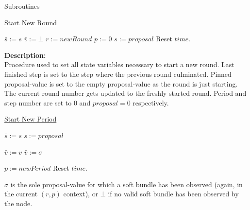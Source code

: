 \documentclass[10pt,a4paper]{article}
\begin{document}
\begin{section}{Subroutines}

\begin{algorithm}[H]\label{algo:start-new-round}
    \caption{\underline{Start New Round}}
    \label{algo:start-new-round}
    \begin{algorithmic}[1]
    \State $\bar{s} := s$
    \State $\bar{v} := \bot$
    \State $r := newRound$
    \State $p := 0$
    \State $s := proposal$
    \State Reset $time$.
    \EndFunction
    \end{algorithmic}
\end{algorithm}

\noindent \textbf{Description:}\\
Procedure used to set all state variables necessary to start a new round.
Last finished step is set to the step where the previous round culminated.
Pinned proposal-value is set to the empty proposal-value as the round is just starting.
The current round number gets updated to the freshly started round.
Period and step number are set to $0$ and $proposal=0$ respectively.


\begin{algorithm}[H]
    \caption{\underline{Start New Period}}
    \label{algo:start-new-period}
    \begin{algorithmic}[1]

    \State $\bar{s} := s$
    \State $s := proposal$

        \State $\bar{v} := v$
    \ElsIf{$\sigma \neq \bot$}
        \State $\bar{v} := \sigma$
    \EndIf

    \State $p := newPeriod$
    \State Reset $time$.
    \EndFunction
    \end{algorithmic}
\end{algorithm}

$\sigma$ is the sole proposal-value for which a soft bundle has been observed (again, 
in the current $(r,p)$ context), or $\bot$ if no valid soft bundle has been observed by the 
node.


\end{section}
\end{document}
